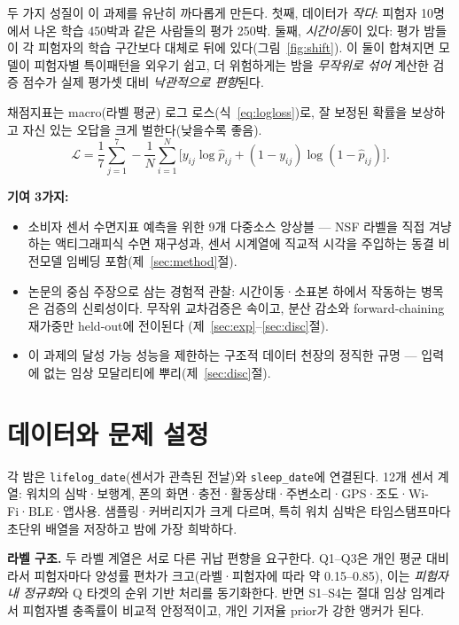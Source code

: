 \documentclass[conference]{IEEEtran}
\begin{document}
두 가지 성질이 이 과제를 유난히 까다롭게 만든다. 첫째, 데이터가 \emph{작다}: 피험자 10명에서 나온 학습
450박과 같은 사람들의 평가 250박. 둘째, \emph{시간이동}이 있다: 평가 밤들이 각 피험자의 학습 구간보다
대체로 뒤에 있다(그림~\ref{fig:shift}). 이 둘이 합쳐지면 모델이 피험자별 특이패턴을 외우기 쉽고, 더
위험하게는 밤을 \emph{무작위로 섞어} 계산한 검증 점수가 실제 평가셋 대비 \emph{낙관적으로 편향}된다.

채점지표는 macro(라벨 평균) 로그 로스(식~\ref{eq:logloss})로, 잘 보정된 확률을 보상하고 자신 있는 오답을
크게 벌한다(낮을수록 좋음).
\begin{equation}
\mathcal{L} = \frac{1}{7}\sum_{j=1}^{7}
-\frac{1}{N}\sum_{i=1}^{N}\Big[y_{ij}\log \hat p_{ij}+(1-y_{ij})\log(1-\hat p_{ij})\Big].
\label{eq:logloss}
\end{equation}

\textbf{기여 3가지:}
\begin{itemize}
\item 소비자 센서 수면지표 예측을 위한 9개 다중소스 앙상블 — NSF 라벨을 직접 겨냥하는 액티그래피식 수면
재구성과, 센서 시계열에 직교적 시각을 주입하는 동결 비전모델 임베딩 포함(제~\ref{sec:method}절).
\item 논문의 중심 주장으로 삼는 경험적 관찰: 시간이동·소표본 하에서 작동하는 병목은 검증의 신뢰성이다.
무작위 교차검증은 속이고, 분산 감소와 forward-chaining 재가중만 held-out에 전이된다
(제~\ref{sec:exp}--\ref{sec:disc}절).
\item 이 과제의 달성 가능 성능을 제한하는 구조적 데이터 천장의 정직한 규명 — 입력에 없는 임상 모달리티에
뿌리(제~\ref{sec:disc}절).
\end{itemize}

\section{데이터와 문제 설정}
\label{sec:data}
각 밤은 \texttt{lifelog\_date}(센서가 관측된 전날)와 \texttt{sleep\_date}에 연결된다. 12개 센서 계열:
워치의 심박·보행계, 폰의 화면·충전·활동상태·주변소리·GPS·조도·Wi-Fi·BLE·앱사용. 샘플링·커버리지가 크게
다르며, 특히 워치 심박은 타임스탬프마다 초단위 배열을 저장하고 밤에 가장 희박하다.

\textbf{라벨 구조.} 두 라벨 계열은 서로 다른 귀납 편향을 요구한다. Q1--Q3은 개인 평균 대비라서 피험자마다
양성률 편차가 크고(라벨·피험자에 따라 약 0.15--0.85), 이는 \emph{피험자내 정규화}와 Q 타겟의 순위 기반
처리를 동기화한다. 반면 S1--S4는 절대 임상 임계라서 피험자별 충족률이 비교적 안정적이고, 개인 기저율
prior가 강한 앵커가 된다.
\end{document}
